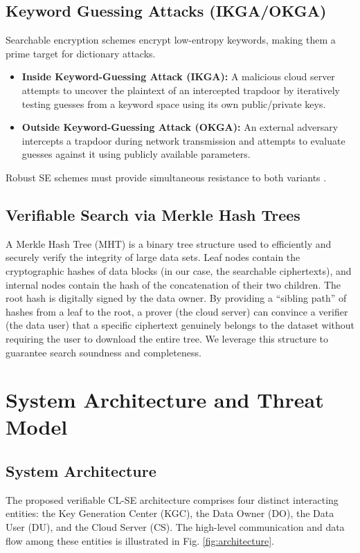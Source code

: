 \documentclass[10pt,journal,compsoc]{IEEEtran}
\begin{document}
\subsection{Keyword Guessing Attacks (IKGA/OKGA)}
Searchable encryption schemes encrypt low-entropy keywords, making them a prime target for dictionary attacks. 
\begin{itemize}
    \item \textbf{Inside Keyword-Guessing Attack (IKGA):} A malicious cloud server attempts to uncover the plaintext of an intercepted trapdoor by iteratively testing guesses from a keyword space using its own public/private keys.
    \item \textbf{Outside Keyword-Guessing Attack (OKGA):} An external adversary intercepts a trapdoor during network transmission and attempts to evaluate guesses against it using publicly available parameters.
\end{itemize}
Robust SE schemes must provide simultaneous resistance to both variants \cite{lu2023certificateless}.

\subsection{Verifiable Search via Merkle Hash Trees}
A Merkle Hash Tree (MHT) is a binary tree structure used to efficiently and securely verify the integrity of large data sets. Leaf nodes contain the cryptographic hashes of data blocks (in our case, the searchable ciphertexts), and internal nodes contain the hash of the concatenation of their two children. The root hash is digitally signed by the data owner. By providing a ``sibling path'' of hashes from a leaf to the root, a prover (the cloud server) can convince a verifier (the data user) that a specific ciphertext genuinely belongs to the dataset without requiring the user to download the entire tree. We leverage this structure to guarantee search soundness and completeness.

\section{System Architecture and Threat Model}\label{sec:system}

\subsection{System Architecture}
The proposed verifiable CL-SE architecture comprises four distinct interacting entities: the Key Generation Center (KGC), the Data Owner (DO), the Data User (DU), and the Cloud Server (CS). The high-level communication and data flow among these entities is illustrated in Fig. \ref{fig:architecture}.
\end{document}
